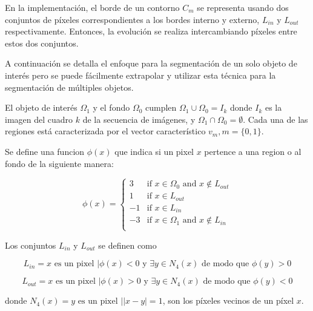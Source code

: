 \documentclass[a4paper,10pt]{article}
\begin{document}
En la implementación, el borde de un contorno $C_m$ se representa usando dos conjuntos de píxeles
correspondientes a los bordes interno y externo, $L_{in}$ y $L_{out}$
respectivamente. Entonces, la evolución se realiza intercambiando píxeles entre
estos dos conjuntos.

A continuación se detalla el enfoque para la segmentación de un solo objeto de
interés pero se puede fácilmente extrapolar y utilizar esta técnica para la
segmentación de múltiples objetos.


El objeto de interés $\Omega_{1}$ y el fondo $\Omega_{0}$ cumplen
$\Omega_{1}\cup\Omega_{0} = I_{k}$ donde $I_{k}$ es la imagen del cuadro $k$ de
la secuencia de imágenes, y $\Omega_{1}\cap\Omega_{0} = \emptyset$. Cada una de
las regiones está caracterizada por el vector característico $v_{m}, m =
\{0,1\}$. 

Se define una funcion $\phi(x)$ que indica si un pixel $x$ pertence a una region o al fondo de la siguiente manera:

\begin{equation}
\phi(x) =
\left\{
    \begin{array}{ll}
        3  & \mbox{if } x \in \Omega_{0} \mbox{  and  } x \notin L_{out} \\
        1  & \mbox{if } x \in L_{out}\\
        -1  & \mbox{if } x \in L_{in}\\
        -3 & \mbox{if } x \in \Omega_{1} \mbox{  and  } x \notin L_{in} \\
    \end{array}
\right.
\end{equation}

Los conjuntos $L_{in}$ y $L_{out}$ se definen como

\begin{equation}
    L_{in} = {x \mbox{ es un pixel } \vert \phi(x) < 0 \mbox{ y } \exists y \in N_{4}(x) \mbox{ de modo que } \phi(y) > 0}
\end{equation}

\begin{equation}
    L_{out} = {x \mbox{ es un pixel } \vert \phi(x) > 0 \mbox{ y } \exists y \in N_{4}(x) \mbox{ de modo que } \phi(y) < 0}
\end{equation}

donde $N_{4}(x) = { y \mbox{ es un pixel } \vert |x-y| = 1}$, son los píxeles
vecinos de un píxel $x$.
\end{document}
